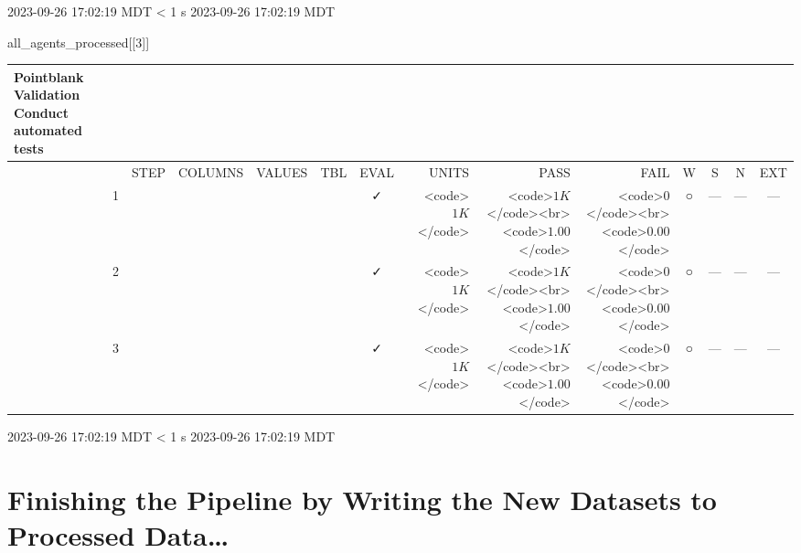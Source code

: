 \documentclass[
  letterpaper,
  DIV=11,
  numbers=noendperiod]{scrreprt}
\newenvironment{Shaded}{\begin{snugshade}}{\end{snugshade}}
\newcommand{\DecValTok}[1]{\textcolor[rgb]{0.68,0.00,0.00}{#1}}
\newcommand{\NormalTok}[1]{\textcolor[rgb]{0.00,0.23,0.31}{#1}}
\begin{document}
\begin{minipage}{\linewidth}
2023-09-26 17:02:19 MDT
\textless{} 1 s
2023-09-26 17:02:19 MDT\\
\end{minipage}

\begin{Shaded}
\begin{Highlighting}[]
\NormalTok{all\_agents\_processed[[}\DecValTok{3}\NormalTok{]]}
\end{Highlighting}
\end{Shaded}

\setlength{\LTpost}{0mm}
\begin{longtable}{lrlllccrrrcccc}
\caption*{
{\large Pointblank Validation} \\ 
{\small Conduct automated tests}
} \\ 
\toprule
 &  & STEP & COLUMNS & VALUES & TBL & EVAL & UNITS & PASS & FAIL & W & S & N & EXT \\ 
\midrule
 & 1 &  &  &  &                                                              & ✓ & <code>$1K$</code> & <code>$1K$</code><br><code>$1.00$</code> & <code>$0$</code><br><code>$0.00$</code> & ○ & --- & --- & --- \\ 
 & 2 &  &  &  &                                                              & ✓ & <code>$1K$</code> & <code>$1K$</code><br><code>$1.00$</code> & <code>$0$</code><br><code>$0.00$</code> & ○ & --- & --- & --- \\ 
 & 3 &  &  &  &                                                              & ✓ & <code>$1K$</code> & <code>$1K$</code><br><code>$1.00$</code> & <code>$0$</code><br><code>$0.00$</code> & ○ & --- & --- & --- \\ 
\bottomrule
\end{longtable}
\begin{minipage}{\linewidth}
2023-09-26 17:02:19 MDT
\textless{} 1 s
2023-09-26 17:02:19 MDT\\
\end{minipage}

\hypertarget{finishing-the-pipeline-by-writing-the-new-datasets-to-processed-data}{%
\section{Finishing the Pipeline by Writing the New Datasets to Processed
Data\ldots{}}\label{finishing-the-pipeline-by-writing-the-new-datasets-to-processed-data}}
\end{document}

